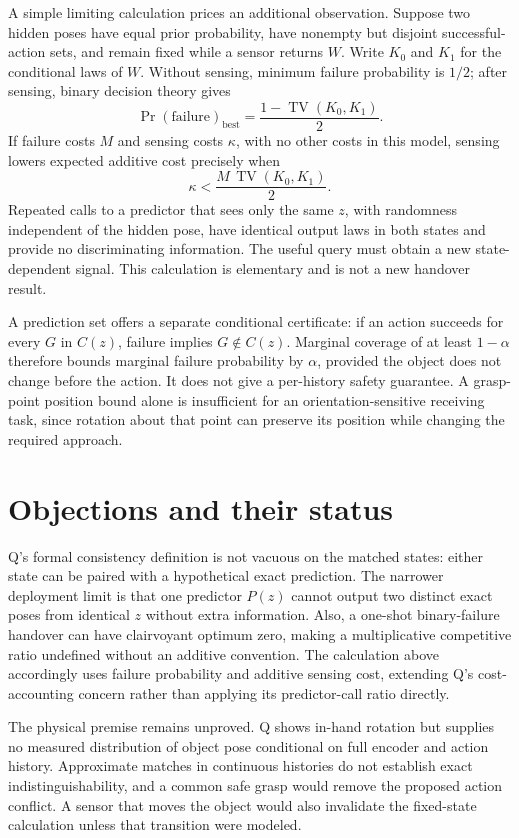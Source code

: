 \documentclass{article}
\begin{document}
A simple limiting calculation prices an additional observation. Suppose two hidden poses have equal prior probability, have nonempty but disjoint successful-action sets, and remain fixed while a sensor returns \(W\). Write \(K_0\) and \(K_1\) for the conditional laws of \(W\). Without sensing, minimum failure probability is \(1/2\); after sensing, binary decision theory gives
\[
\Pr(\text{failure})_{\mathrm{best}}
 = \frac{1-\operatorname{TV}(K_0,K_1)}{2}.
\]
If failure costs \(M\) and sensing costs \(\kappa\), with no other costs in this model, sensing lowers expected additive cost precisely when
\[
\kappa < \frac{M\,\operatorname{TV}(K_0,K_1)}{2}.
\]
Repeated calls to a predictor that sees only the same \(z\), with randomness independent of the hidden pose, have identical output laws in both states and provide no discriminating information. The useful query must obtain a new state-dependent signal. This calculation is elementary and is not a new handover result. 

A prediction set offers a separate conditional certificate: if an action succeeds for every \(G\) in \(C(z)\), failure implies \(G\notin C(z)\). Marginal coverage of at least \(1-\alpha\) therefore bounds marginal failure probability by \(\alpha\), provided the object does not change before the action. It does not give a per-history safety guarantee. A grasp-point position bound alone is insufficient for an orientation-sensitive receiving task, since rotation about that point can preserve its position while changing the required approach. 

\section{Objections and their status}

Q's formal consistency definition is not vacuous on the matched states: either state can be paired with a hypothetical exact prediction. The narrower deployment limit is that one predictor \(P(z)\) cannot output two distinct exact poses from identical \(z\) without extra information. Also, a one-shot binary-failure handover can have clairvoyant optimum zero, making a multiplicative competitive ratio undefined without an additive convention. The calculation above accordingly uses failure probability and additive sensing cost, extending Q's cost-accounting concern rather than applying its predictor-call ratio directly. 

The physical premise remains unproved. Q shows in-hand rotation but supplies no measured distribution of object pose conditional on full encoder and action history. Approximate matches in continuous histories do not establish exact indistinguishability, and a common safe grasp would remove the proposed action conflict. A sensor that moves the object would also invalidate the fixed-state calculation unless that transition were modeled. 
\end{document}
